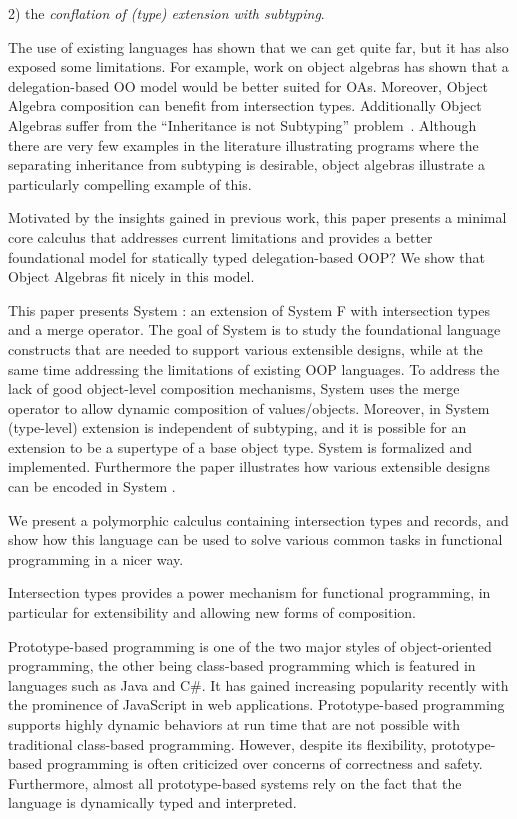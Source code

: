  2) the
\emph{conflation of (type) extension with subtyping}.

The use of existing languages has shown that we can get quite far, but
it has also exposed some limitations. For example, work on object
algebras has shown that a delegation-based OO model would be better
suited for OAs. Moreover, Object Algebra composition can benefit from
intersection types. Additionally Object Algebras suffer from the
``Inheritance is not Subtyping'' problem~\cite{cook1989inheritance}.
Although there are very few examples in the literature illustrating
programs where the separating inheritance from subtyping is desirable,
object algebras illustrate a particularly compelling example of this.

Motivated by the insights gained in previous work, this paper presents 
a minimal core calculus that addresses current limitations and
provides a better foundational model for statically typed
delegation-based OOP? We show that Object Algebras fit nicely in this
model. 

This paper presents System \name: an extension of System F with
intersection types and a merge operator.  The goal of System \name is
to study the foundational language constructs that are needed to
support various extensible designs, while at the same time addressing
the limitations of existing OOP languages. To address the lack of good
object-level composition mechanisms, System \name uses the merge
operator to allow dynamic composition of values/objects. Moreover, in
System \name (type-level) extension is independent of subtyping, and
it is possible for an extension to be a supertype of a base object
type.  System \name is formalized and implemented. Furthermore the
paper illustrates how various extensible designs can be encoded in
System \name.

We present a polymorphic calculus containing intersection types and records, and show
how this language can be used to solve various common tasks in functional
programming in a nicer way.

Intersection types provides a power mechanism for functional programming, in
particular for extensibility and allowing new forms of composition.

Prototype-based programming is one of the two major styles of object-oriented
programming, the other being class-based programming which is featured in
languages such as Java and C\#. It has gained increasing popularity recently
with the prominence of JavaScript in web applications. Prototype-based
programming supports highly dynamic behaviors at run time that are not possible
with traditional class-based programming. However, despite its flexibility,
prototype-based programming is often criticized over concerns of correctness and
safety. Furthermore, almost all prototype-based systems rely on the fact that
the language is dynamically typed and interpreted.


